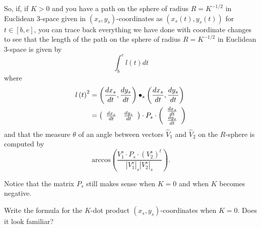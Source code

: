 So, if, if $K>0$ and you have a path on the sphere of radius $R=K^{-1/2}$ in
Euclidean $3$-space given in $\left(  x_{s},y_{s}\right)  $-coordinates as
$\left(  x_{s}\left(  t\right)  ,y_{s}\left(  t\right)  \right)  $ for
$t\in\left[  b,e\right]  $, you can trace back everything we have done with
coordinate changes to see that the length of the path on the sphere of radius
$R=K^{-1/2}$ in Euclidean $3$-space is given by%
\[%
{\displaystyle\int\nolimits_{b}^{e}}
l\left(  t\right)  dt
\]
where%
\begin{align*}
l\left(  t\right)  ^{2}  &  =\left(  \frac{dx_{s}}{dt},\frac{dy_{s}}%
{dt}\right)  \bullet_{s}\left(  \frac{dx_{s}}{dt},\frac{dy_{s}}{dt}\right) \\
&  =\left(
\begin{array}
[c]{cc}%
\frac{dx_{s}}{dt} & \frac{dy_{s}}{dt}%
\end{array}
\right)  \cdot P_{s}\cdot\left(
\begin{array}
[c]{c}%
\frac{dx_{s}}{dt}\\
\frac{dy_{s}}{dt}%
\end{array}
\right)
\end{align*}
and that the measure $\theta$ of an angle between vectors $\hat{V}_{1}$ and
$\hat{V}_{2}$ on the $R$-sphere is computed by%
\[
\mathrm{arccos}\left(  \frac{V_{1}^{s}\cdot P_{s}\cdot\left(  V_{2}%
^{s}\right)  ^{t}}{\left\vert V_{1}^{s}\right\vert _{s}\left\vert V_{2}%
^{s}\right\vert _{s}}\right)  .
\]


Notice that the matrix $P_{s}$ still makes sense when $K=0$ and when $K$
becomes negative.

\begin{exercise}
Write the formula for the $K$-dot product $\left(  x_{s},y_{s}\right)
$-coordinates when $K=0$. Does it look familiar?
\end{exercise}

